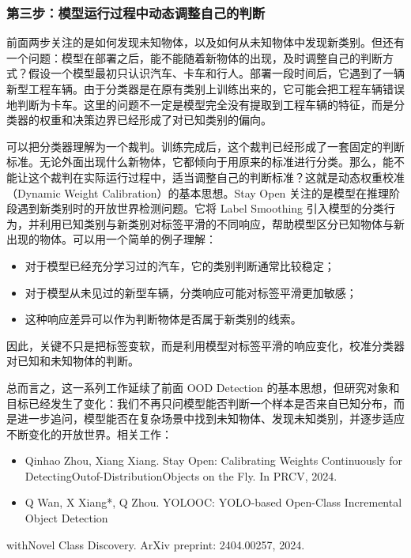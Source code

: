 \subsubsection*{第三步：模型运行过程中动态调整自己的判断}

前面两步关注的是如何发现未知物体，以及如何从未知物体中发现新类别。但还有一个问题：模型在部署之后，能不能随着新物体的出现，及时调整自己的判断方式？假设一个模型最初只认识汽车、卡车和行人。部署一段时间后，它遇到了一辆新型工程车辆。由于分类器是在原有类别上训练出来的，它可能会把工程车辆错误地判断为卡车。这里的问题不一定是模型完全没有提取到工程车辆的特征，而是分类器的权重和决策边界已经形成了对已知类别的偏向。

可以把分类器理解为一个裁判。训练完成后，这个裁判已经形成了一套固定的判断标准。无论外面出现什么新物体，它都倾向于用原来的标准进行分类。那么，能不能让这个裁判在实际运行过程中，适当调整自己的判断标准？这就是动态权重校准（Dynamic Weight Calibration）的基本思想。Stay Open 关注的是模型在推理阶段遇到新类别时的开放世界检测问题。它将 Label Smoothing 引入模型的分类行为，并利用已知类别与新类别对标签平滑的不同响应，帮助模型区分已知物体与新出现的物体。可以用一个简单的例子理解：

\begin{itemize}
  \item 对于模型已经充分学习过的汽车，它的类别判断通常比较稳定；
  \item 对于模型从未见过的新型车辆，分类响应可能对标签平滑更加敏感；
  \item 这种响应差异可以作为判断物体是否属于新类别的线索。
\end{itemize}

因此，关键不只是把标签变软，而是利用模型对标签平滑的响应变化，校准分类器对已知和未知物体的判断。

总而言之，这一系列工作延续了前面 OOD Detection 的基本思想，但研究对象和目标已经发生了变化：我们不再只问模型能否判断一个样本是否来自已知分布，而是进一步追问，模型能否在复杂场景中找到未知物体、发现未知类别，并逐步适应不断变化的开放世界。相关工作：

\begin{itemize}
  \item Qinhao Zhou, Xiang Xiang. Stay Open: Calibrating Weights Continuously for DetectingOutof-DistributionObjects on the Fly. In PRCV, 2024.
  \item Q Wan, X Xiang*, Q Zhou. YOLOOC: YOLO-based Open-Class Incremental Object Detection
\end{itemize}

withNovel Class Discovery. ArXiv preprint: 2404.00257, 2024.

